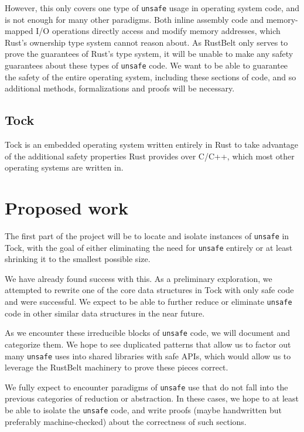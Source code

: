 \documentclass[12pt]{article}
\begin{document}
However, this only covers one type of \texttt{unsafe} usage in operating system code, and is not enough for many other paradigms. Both inline assembly code and memory-mapped I/O operations directly access and modify memory addresses, which Rust's ownership type system cannot reason about. As RustBelt only serves to prove the guarantees of Rust's type system, it will be unable to make any safety guarantees about these types of \texttt{unsafe} code. We want to be able to guarantee the safety of the entire operating system, including these sections of code, and so additional methods, formalizations and proofs will be necessary.

\subsection{Tock}
Tock is an embedded operating system written entirely in Rust to take advantage of the additional safety properties Rust provides over C/C++, which most other operating systems are written in.

\section{Proposed work}
The first part of the project will be to locate and isolate instances of \texttt{unsafe} in Tock, with the goal of either eliminating the need for \texttt{unsafe} entirely or at least shrinking it to the smallest possible size. 

We have already found success with this. As a preliminary exploration, we attempted to rewrite one of the core data structures in Tock with only safe code and were successful. We expect to be able to further reduce or eliminate \texttt{unsafe} code in other similar data structures in the near future.

As we encounter these irreducible blocks of \texttt{unsafe} code, we will document and categorize them. We hope to see duplicated patterns that allow us to factor out many \texttt{unsafe} uses into shared libraries with safe APIs, which would allow us to leverage the RustBelt machinery to prove these pieces correct.

We fully expect to encounter paradigms of \texttt{unsafe} use that do not fall into the previous categories of reduction or abstraction. In these cases, we hope to at least be able to isolate the \texttt{unsafe} code, and write proofs (maybe handwritten but preferably machine-checked) about the correctness of such sections.
\end{document}
